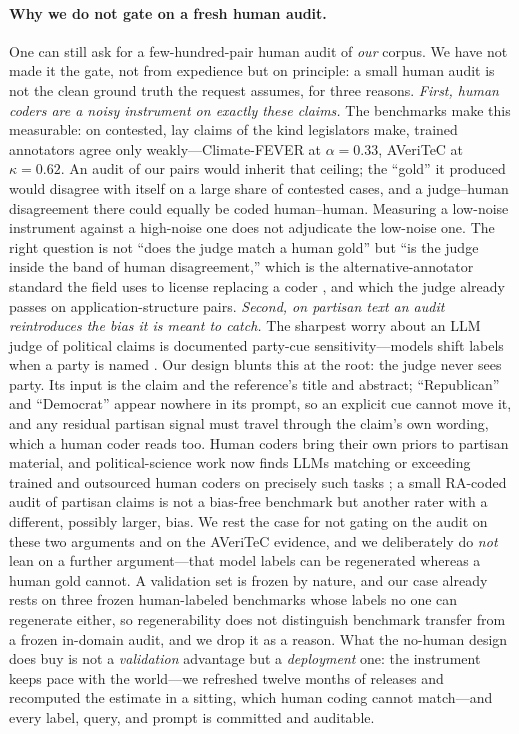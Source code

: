 \paragraph{Why we do not gate on a fresh human audit.} One can still ask for a
few-hundred-pair human audit of \emph{our} corpus. We have not made it the gate, not from expedience but on
principle: a small human audit is not the clean ground truth the request assumes, for three reasons.
\emph{First, human coders are a noisy instrument on exactly these claims.} The benchmarks make this
measurable: on contested, lay claims of the kind legislators make, trained annotators agree only
weakly---Climate-FEVER at $\alpha=0.33$, AVeriTeC at $\kappa=0.62$. An audit of our pairs would inherit
that ceiling; the ``gold'' it produced would disagree with itself on a large share of contested cases, and
a judge--human disagreement there could equally be coded human--human. Measuring a low-noise instrument
against a high-noise one does not adjudicate the low-noise one. The right question is not ``does the judge
match a human gold'' but ``is the judge inside the band of human disagreement,'' which is the
alternative-annotator standard the field uses to license replacing a coder \citep{calderon2025alttest},
and which the judge already passes on application-structure pairs. \emph{Second, on partisan text an audit
reintroduces the bias it is meant to catch.} The sharpest worry about an LLM judge of political claims is
documented party-cue sensitivity---models shift labels when a party is named \citep{clemm2025partycues}.
Our design blunts this at the root: the judge never sees party. Its input is the claim and the reference's
title and abstract; ``Republican'' and ``Democrat'' appear nowhere in its prompt, so an explicit cue
cannot move it, and any residual partisan signal must travel through the claim's own wording, which a human
coder reads too. Human coders bring their own priors to partisan material, and political-science work now
finds LLMs matching or exceeding trained and outsourced human coders on precisely such tasks
\citep{tornberg2024llmexpert,heseltine2024llm}; a small RA-coded audit of partisan claims is not a
bias-free benchmark but another rater with a different, possibly larger, bias. We rest the case for not
gating on the audit on these two arguments and on the AVeriTeC evidence, and we deliberately do \emph{not}
lean on a further argument---that model labels can be regenerated whereas a human
gold cannot. A validation set is frozen by nature, and our case already rests on three frozen human-labeled
benchmarks whose labels no one can regenerate either, so regenerability does not distinguish benchmark
transfer from a frozen in-domain audit, and we drop it as a reason. What the no-human design does buy is
not a \emph{validation} advantage but a \emph{deployment} one: the instrument keeps pace with the
world---we refreshed twelve months of releases and recomputed the estimate in a sitting, which human coding
cannot match---and every label, query, and prompt is committed and auditable.

